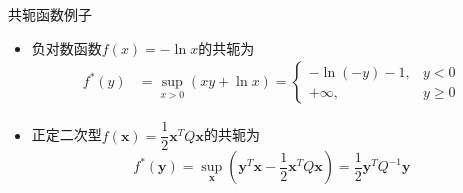 \begin{frame}

\begin{block}{共轭函数例子}
\begin{itemize}
\item 负对数函数$f(x) = -\ln x$的共轭为
\begin{align*}
f^*(y) & = \sup\limits_{x>0} \left( xy + \ln x \right) = \begin{cases}
-\ln(-y) - 1, & y < 0 \\
+\infty, & y \ge 0
\end{cases}
\end{align*}
\item 正定二次型$f(\mathbf{x}) = \dfrac{1}{2} \mathbf{x}^T Q \mathbf{x}$的共轭为
$$f^*(\mathbf{y}) = \sup\limits_{\mathbf{x}} \left( \mathbf{y}^T\mathbf{x} - \dfrac{1}{2} \mathbf{x}^T Q \mathbf{x} \right) = \dfrac{1}{2} \mathbf{y}^T Q^{-1} \mathbf{y}$$
\end{itemize}
\end{block}

\end{frame}








